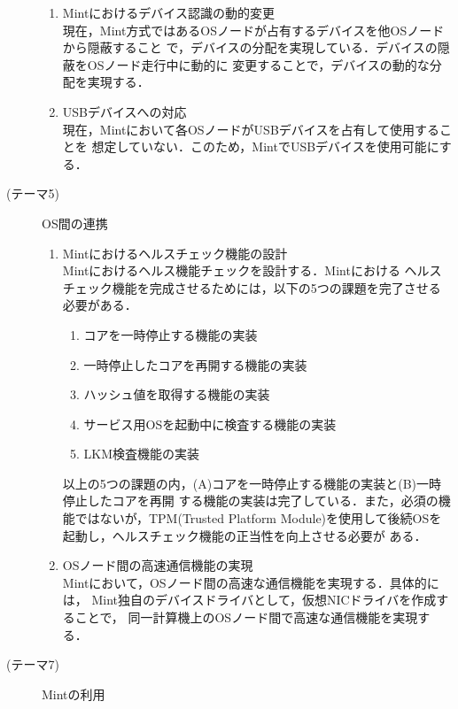 \documentclass[12pt]{jsarticle}
\begin{document}
\begin{description}
\begin{enumerate}
            \item Mintにおけるデバイス認識の動的変更\\
                現在，Mint方式ではあるOSノードが占有するデバイスを他OSノードから隠蔽すること
                で，デバイスの分配を実現している．デバイスの隠蔽をOSノード走行中に動的に
                変更することで，デバイスの動的な分配を実現する．
            \item USBデバイスへの対応\\
                現在，Mintにおいて各OSノードがUSBデバイスを占有して使用することを
                想定していない．このため，MintでUSBデバイスを使用可能にする．
        \end{enumerate}
    \item[(テーマ5)]OS間の連携
        \begin{enumerate}
            \item Mintにおけるヘルスチェック機能の設計\\
                Mintにおけるヘルス機能チェックを設計する．Mintにおける
                ヘルスチェック機能を完成させるためには，以下の5つの課題を完了させる必要がある．
                \begin{enumerate}
                    \item コアを一時停止する機能の実装
                    \item 一時停止したコアを再開する機能の実装
                    \item ハッシュ値を取得する機能の実装
                    \item サービス用OSを起動中に検査する機能の実装
                    \item LKM検査機能の実装
                \end{enumerate}
                以上の5つの課題の内，(A)コアを一時停止する機能の実装と(B)一時停止したコアを再開
                する機能の実装は完了している．また，必須の機能ではないが，TPM(Trusted Platform
                Module)を使用して後続OSを起動し，ヘルスチェック機能の正当性を向上させる必要が
                ある．
            \item OSノード間の高速通信機能の実現\\
                Mintにおいて，OSノード間の高速な通信機能を実現する．具体的には，
                Mint独自のデバイスドライバとして，仮想NICドライバを作成することで，
                同一計算機上のOSノード間で高速な通信機能を実現する．
        \end{enumerate}
    \item[(テーマ7)]Mintの利用

\end{description}
\end{document}
